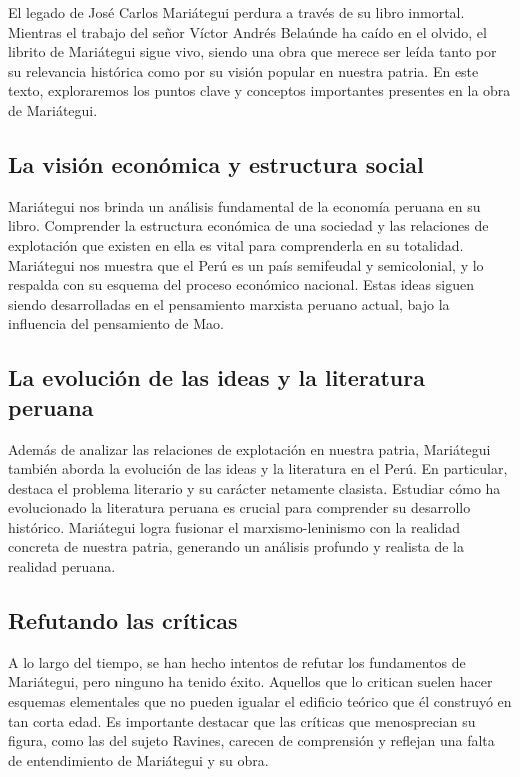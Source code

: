 \documentclass[
  jou,
  floatsintext,
  longtable,
  a4paper,
  nolmodern,
  notxfonts,
  notimes,
  12pt,
  colorlinks=true,linkcolor=blue,citecolor=blue,urlcolor=blue]{apa7}
\begin{document}
El legado de José Carlos Mariátegui perdura a través de su libro
inmortal. Mientras el trabajo del señor Víctor Andrés Belaúnde ha caído
en el olvido, el librito de Mariátegui sigue vivo, siendo una obra que
merece ser leída tanto por su relevancia histórica como por su visión
popular en nuestra patria. En este texto, exploraremos los puntos clave
y conceptos importantes presentes en la obra de Mariátegui.

\subsection{La visión económica y estructura
social}\label{la-visiuxf3n-econuxf3mica-y-estructura-social}

Mariátegui nos brinda un análisis fundamental de la economía peruana en
su libro. Comprender la estructura económica de una sociedad y las
relaciones de explotación que existen en ella es vital para comprenderla
en su totalidad. Mariátegui nos muestra que el Perú es un país
semifeudal y semicolonial, y lo respalda con su esquema del proceso
económico nacional. Estas ideas siguen siendo desarrolladas en el
pensamiento marxista peruano actual, bajo la influencia del pensamiento
de Mao.

\subsection{La evolución de las ideas y la literatura
peruana}\label{la-evoluciuxf3n-de-las-ideas-y-la-literatura-peruana}

Además de analizar las relaciones de explotación en nuestra patria,
Mariátegui también aborda la evolución de las ideas y la literatura en
el Perú. En particular, destaca el problema literario y su carácter
netamente clasista. Estudiar cómo ha evolucionado la literatura peruana
es crucial para comprender su desarrollo histórico. Mariátegui logra
fusionar el marxismo-leninismo con la realidad concreta de nuestra
patria, generando un análisis profundo y realista de la realidad
peruana.

\subsection{Refutando las críticas}\label{refutando-las-cruxedticas}

A lo largo del tiempo, se han hecho intentos de refutar los fundamentos
de Mariátegui, pero ninguno ha tenido éxito. Aquellos que lo critican
suelen hacer esquemas elementales que no pueden igualar el edificio
teórico que él construyó en tan corta edad. Es importante destacar que
las críticas que menosprecian su figura, como las del sujeto Ravines,
carecen de comprensión y reflejan una falta de entendimiento de
Mariátegui y su obra.
\end{document}
